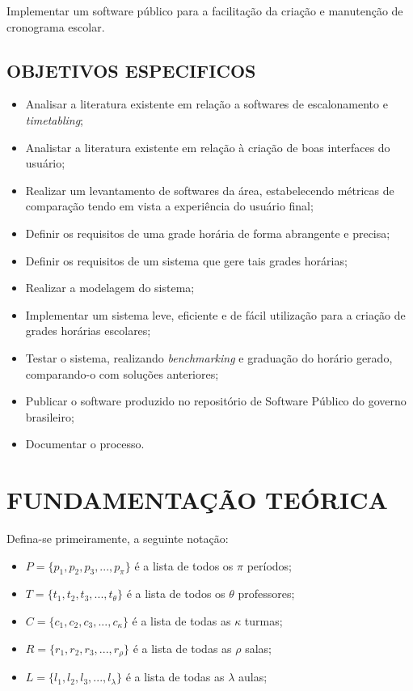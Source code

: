 \documentclass[12pt,a4paper]{article}
\begin{document}
			\par Implementar um software público para a facilitação da criação e manutenção de cronograma escolar.


		\subsection{OBJETIVOS ESPECIFICOS}

			\begin{itemize}
				\item Analisar a literatura existente em relação a softwares de escalonamento e \textit{timetabling};
				\item Analistar a literatura existente em relação à criação de boas interfaces do usuário;
				\item Realizar um levantamento de softwares da área, estabelecendo métricas de comparação tendo em vista a experiência do usuário final;
				\item Definir os requisitos de uma grade horária de forma abrangente e precisa;
				\item Definir os requisitos de um sistema que gere tais grades horárias;
				\item Realizar a modelagem do sistema;
				\item Implementar um sistema leve, eficiente e de fácil utilização para a criação de grades horárias escolares;
				\item Testar o sistema, realizando \textit{benchmarking} e graduação do horário gerado, com\-pa\-ran\-do-o com soluções anteriores;
				\item Publicar o software produzido no repositório de Software Público do governo brasileiro;
				\item Documentar o processo.
			\end{itemize}

	\newpage


	\section{FUNDAMENTAÇÃO TEÓRICA}

		Defina-se primeiramente, a seguinte notação:

		\begin{itemize}
			\item $P = \{p_1, p_2, p_3, ..., p_\pi\}$ é a lista de todos os $\pi$ períodos;
			\item $T = \{t_1, t_2, t_3, ..., t_\theta\}$ é a lista de todos os $\theta$ professores;
			\item $C = \{c_1, c_2, c_3, ..., c_\kappa\} $ é a lista de todas as $\kappa$ turmas;
			\item $R = \{r_1, r_2, r_3, ..., r_\rho\}$ é a lista de todas as $\rho$ salas;
			\item $L = \{l_1, l_2, l_3, ..., l_\lambda\}$ é a lista de todas as $\lambda$ aulas;
		\end{itemize}
\end{document}
